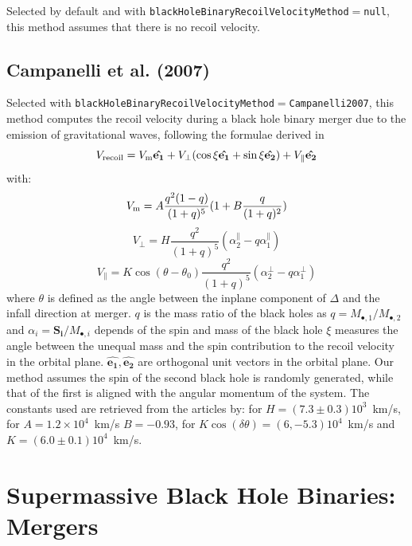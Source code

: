 Selected by default and with {\tt blackHoleBinaryRecoilVelocityMethod}$=${\tt null}, this method assumes that there is no recoil velocity.

\subsection{Campanelli et al. (2007)}

Selected with {\tt blackHoleBinaryRecoilVelocityMethod}$=${\tt Campanelli2007}, this method computes the recoil velocity during a black hole binary merger due to the emission of gravitational waves, following the formulae derived in \cite {campanelli_large_2007}
\begin{equation}
V_{\rm recoil}=V_{\rm m}\mathbf{\hat{e_1}}+V_\perp(\cos\xi\mathbf{\hat{e_1}}+\sin\xi\mathbf{\hat{e_2}})+V_\parallel\mathbf{\hat{e_2}} 
\end{equation}
with:
\begin{equation}
V_{\rm m}=A\frac{q^2(1-q)}{(1+q)^5}(1+B\frac{q}{(1+q)^2})
\end{equation}
\begin{equation}
V_\perp=H\frac{q^2}{(1+q)^5}(\alpha^\parallel_2-q\alpha^\parallel_1)
\end{equation}
\begin{equation}
V_\parallel=K\cos(\theta-\theta_0)\frac{q^2}{(1+q)^5}(\alpha^\perp_2-q\alpha^\perp_1)
\end{equation}
where $\theta$ is defined as the angle between the inplane \gls{component} of $\Delta$ and the infall direction at merger. $q$ is the mass ratio of the black holes as $q=M_{\bullet,1}/M_{\bullet,2}$ and $\alpha_i=\mathbf{S_i}/M_{\bullet,i}$ depends of the spin and mass of the black hole $\xi$ measures the angle between the unequal mass and the spin contribution to the recoil velocity in the orbital plane. $\mathbf{\hat{e_1}} , \mathbf{\hat{e_2}}$ are orthogonal unit vectors in the orbital plane. Our method assumes the spin of the second black hole is randomly generated, while that of the first is aligned with the angular momentum of the system. The constants used are retrieved from the articles by: \cite{koppitz_recoil_2007} for $H=(7.3\pm 0.3)10^3$~km/s, \cite{gonzalez_maximum_2007} for $A=1.2 \times 10^4$~km/s $B=-0.93$, \cite{gonzalez_supermassive_2007} for $K\cos(\delta\theta)=(6,-5.3)10^4$~km/s and $K=(6.0\pm 0.1)10^4$~km/s.

\section{Supermassive Black Hole Binaries: Mergers}

